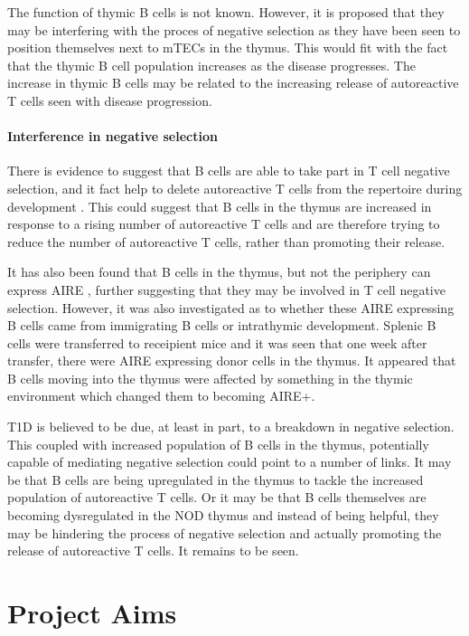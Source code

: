 The function of thymic B cells is not known.
However, it is proposed that they may be interfering with the proces of negative selection as they have been seen to position themselves next to mTECs in the thymus.
This would fit with the fact that the thymic B cell population increases as the disease progresses.
The increase in thymic B cells may be related to the increasing release of autoreactive T cells seen with disease progression.

\paragraph{Interference in negative selection}

There is evidence to suggest that B cells are able to take part in T cell negative selection, and it fact help to delete autoreactive T cells from the repertoire during development \citep{Frommer2010}.
This could suggest that B cells in the thymus are increased in response to a rising number of autoreactive T cells and are therefore trying to reduce the number of autoreactive T cells, rather than promoting their release.

It has also been found that B cells in the thymus, but not the periphery can express AIRE \citep{Yamano2015}, further suggesting that they may be involved in T cell negative selection.
However, it was also investigated as to whether these AIRE expressing B cells came from immigrating B cells or intrathymic development.
Splenic B cells were transferred to receipient mice and it was seen that one week after transfer, there were AIRE expressing donor cells in the thymus.
It appeared that B cells moving into the thymus were affected by something in the thymic environment which changed them to becoming AIRE+.

T1D is believed to be due, at least in part, to a breakdown in negative selection.
This coupled with increased population of B cells in the thymus, potentially capable of mediating negative selection could point to a number of links.
It may be that B cells are being upregulated in the thymus to tackle the increased population of autoreactive T cells.
Or it may be that B cells themselves are becoming dysregulated in the NOD thymus and instead of being helpful, they may be hindering the process of negative selection and actually promoting the release of autoreactive T cells.
It remains to be seen.

\section{Project Aims}

